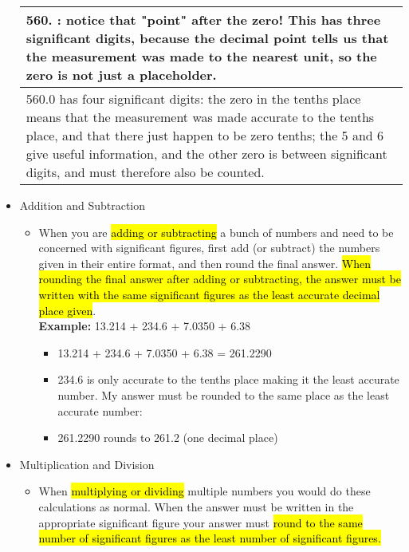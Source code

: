 \begin{itemize}
\begin{table}[h]
\begin{tabular}{|p{16cm}|}
560. : notice that   "point" after the zero! This has three significant digits, because   the decimal point tells us that the measurement was made to the nearest unit,   so the zero is not just a placeholder.                                                                                                   \\ \hline
560.0 has four significant   digits: the zero in the tenths place means that the measurement was made   accurate to the tenths place, and that there just happen to be zero tenths;   the 5 and 6 give useful information, and the other zero is between   significant digits, and must therefore also be counted. \\ \hline
\end{tabular}
\end{table}
\item Addition and Subtraction\\
\begin{itemize}
\item When you are \hl{adding or subtracting} a bunch of numbers and need to be concerned with significant figures, first add (or subtract) the numbers given in their entire format, and then round the final answer. \hl{When rounding the final answer after adding or subtracting, the answer must be written with the same significant figures as the least accurate decimal place given}.\\
\textbf{Example:} 13.214 + 234.6 + 7.0350 + 6.38\\
\begin{itemize}
\item 13.214 + 234.6 + 7.0350 + 6.38 = 261.2290\\
\item 234.6 is only accurate to the tenths place making it the least accurate number. My answer must be rounded to the same place as the least accurate number:\\
\item 261.2290 rounds to 261.2 (one decimal place)\\
\end{itemize}
\end{itemize}
\item Multiplication and Division\\
\begin{itemize}
\item When \hl{multiplying or dividing} multiple numbers you would do these calculations as normal. When the answer must be written in the appropriate significant figure your answer must \hl{round to the same number of significant figures as the least number of significant figures.}\\

\end{itemize}
\end{itemize}
